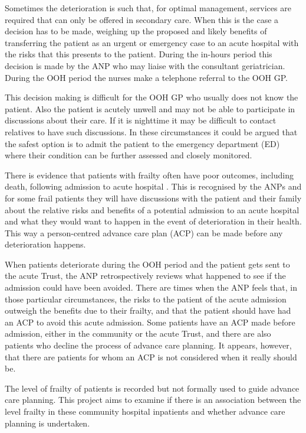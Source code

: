 \documentclass
[
	12pt,
	a4paper,
	oneside,
]{article}
\begin{document}
Sometimes the deterioration is such that, 
for optimal management, services are required that can only be offered in secondary 
care. When this is the case a decision has to be made, weighing up the proposed
and likely benefits of transferring the patient as an urgent or emergency case to
an acute hospital with the risks that this presents to the patient. During the in-hours
period this decision is made by the ANP who may liaise with the consultant geriatrician. During
the OOH period the nurses make a telephone referral to the OOH GP.

This decision making is difficult for the OOH GP who usually does not know the patient.
Also the patient is acutely unwell and may not be able to participate in discussions
about their care. If it is nighttime it may be difficult to contact relatives to 
have such discussions. In these circumstances it could
be argued that the safest option is to admit the patient to the emergency department (ED) where their 
condition can be further assessed and closely monitored.

There is evidence that patients with frailty often have poor outcomes, including death,
following admission to acute hospital \parencite{silver:12, wallis:15}. 
This is recognised by the ANPs and for some frail patients they 
will have discussions with the patient and their family about the relative risks
and benefits of a potential admission to an acute hospital and what they would want to 
happen in the event of deterioration in their health. This way a person-centred 
advance care plan (ACP) can be made before any deterioration happens.

When patients deteriorate during the OOH period and the patient
gets sent to the acute Trust, the ANP retrospectively reviews what happened to see if the admission
could have been avoided. There are times when the ANP feels that, in those particular
circumstances, the risks to the patient of the acute admission outweigh the benefits
due to their frailty, and that the patient should have had an ACP
to avoid this acute admission. Some patients have an ACP made before admission, 
either in the community or the acute Trust,
and there are also patients who decline the process of advance care planning. It appears,
however, that there are patients for whom an ACP is not considered when it really should be.

The level of frailty of patients is recorded but not formally used to guide advance
care planning. This project aims to examine if there is an association between the 
level frailty in these community hospital inpatients and whether advance care planning
is undertaken.
\end{document}
